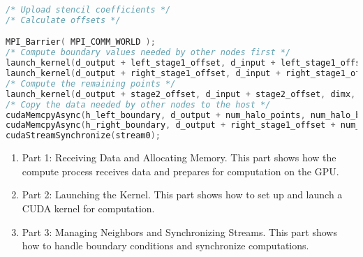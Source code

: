 \begin{itemize}
\begin{lstlisting}[language=C++]
/* Upload stencil coefficients */
/* Calculate offsets */

MPI_Barrier( MPI_COMM_WORLD );
/* Compute boundary values needed by other nodes first */
launch_kernel(d_output + left_stage1_offset, d_input + left_stage1_offset, dimx, dimy, 1/2, stream0);
launch_kernel(d_output + right_stage1_offset, d_input + right_stage1_offset, dimx, dimy, 1/2, stream0);
/* Compute the remaining points */
launch_kernel(d_output + stage2_offset, d_input + stage2_offset, dimx, dimy, dimz, stream1);
/* Copy the data needed by other nodes to the host */
cudaMemcpyAsync(h_left_boundary, d_output + num_halo_points, num_halo_bytes, cudaMemcpyDeviceToHost, stream0);
cudaMemcpyAsync(h_right_boundary, d_output + right_stage1_offset + num_halo_points, num_halo_bytes, cudaMemcpyDeviceToHost, stream0);
cudaStreamSynchronize(stream0);
    \end{lstlisting}

    \begin{enumerate}
        \item Part 1: Receiving Data and Allocating Memory. This part shows how the compute process receives data and prepares for computation on the GPU.
        \item Part 2: Launching the Kernel. This part shows how to set up and launch a CUDA kernel for computation.
        \item Part 3: Managing Neighbors and Synchronizing Streams. This part shows how to handle boundary conditions and synchronize computations.
    \end{enumerate}
\end{itemize}
